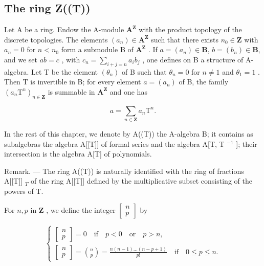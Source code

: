 \subsection{The ring Z((T))}

Let A be a ring. Endow the A-module \(\mathbf{A}^{\mathbf{Z}}\) with the product topology of the discrete topologies. The elements \((a_{n})\in\mathbf{A}^{\mathbf{Z}}\) such that there exists \(n_{0}\in\mathbf{Z}\) with \(a_{n}=0\) for \(n<n_{0}\) form a submodule B of \(\mathbf{A}^{\mathbf{Z}}\) . If \(a=(a_{n})\in\mathbf{B}\), \(b=(b_{n})\in\mathbf{B}\), and we set \(ab=c\) , with \(c_{n}=\sum_{i+j=n}a_{i}b_{j}\) , one defines on B a structure of A-algebra. Let T be the element \((\theta_{n})\) of B such that \(\theta_{n}=0\) for \(n\neq1\) and \(\theta_{1}=1\) . Then T is invertible in B; for every element \(a=(a_{n})\) of B, the family \((a_{n}\mathrm{T}^{n})_{n\in\mathbf{Z}}\) is summable in \(\mathbf{A}^{\mathbf{Z}}\) and one has

\[
a = \sum_ {n \in \mathbf {Z}} a _ {n} \mathrm{T} ^ {n}.
\]

In the rest of this chapter, we denote by A((T)) the A-algebra B; it contains as subalgebras the algebra A{[}{[}T{]}{]} of formal series and the algebra A{[}T, T \(^{-1}\) {]}; their intersection is the algebra A{[}T{]} of polynomials.

Remark. --- The ring A((T)) is naturally identified with the ring of fractions A{[}{[}T{]}{]} \(_{T}\) of the ring A{[}{[}T{]}{]} defined by the multiplicative subset consisting of the powers of T.

For \(n, p\) in \(\mathbf{Z}\) , we define the integer \(\begin{bmatrix} n \\ p \end{bmatrix}\) by

\[
\left\{ \begin{array}{l} {\left[ \begin{array}{l} n \\ p \end{array} \right] = 0 \quad \text {if} \quad p <   0 \quad \text {or} \quad p > n,} \\ {\left[ \begin{array}{l} n \\ p \end{array} \right] = \binom {n} {p} = \frac {n (n - 1) \dots (n - p + 1)}{p !} \quad \text {if} \quad 0 \leqslant p \leqslant n.} \end{array} \right.\tag{1}
\]

